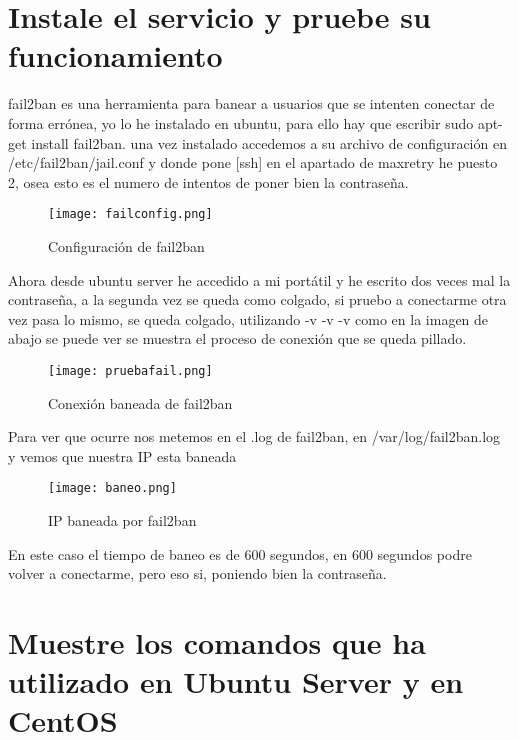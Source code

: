 \section{Instale el servicio y pruebe su funcionamiento}
fail2ban es una herramienta para banear a usuarios que se intenten conectar de forma errónea, yo lo he instalado en ubuntu, para ello hay que escribir sudo apt-get install fail2ban. una vez instalado accedemos a su archivo de configuración en /etc/fail2ban/jail.conf y donde pone [ssh] en el apartado de maxretry he puesto 2, osea esto es el numero de intentos de poner bien la contraseña.
\begin{figure}[H] 
\centering
\texttt{[image: failconfig.png]}  
\label{figura12:}
\caption{Configuración de fail2ban}
\end{figure}
Ahora desde ubuntu server he accedido a mi portátil y he escrito dos veces mal la contraseña, a la segunda vez se queda como colgado, si pruebo a conectarme otra vez pasa lo mismo, se queda colgado, utilizando -v -v -v como en la imagen de abajo se puede ver se muestra el proceso de conexión que se queda pillado.
\begin{figure}[H] 
\centering
\texttt{[image: pruebafail.png]}  
\label{figura13:}
\caption{Conexión baneada de fail2ban}
\end{figure} 
Para ver que ocurre nos metemos en el .log de fail2ban, en /var/log/fail2ban.log y vemos que nuestra IP esta baneada
\begin{figure}[H] 
\centering
\texttt{[image: baneo.png]}  
\label{figura14:}
\caption{IP baneada por fail2ban}
\end{figure}
En este caso el tiempo de baneo es de 600 segundos, en 600 segundos podre volver a conectarme, pero eso si, poniendo bien la contraseña.
\section{Muestre los comandos que ha utilizado en Ubuntu Server y en CentOS}

